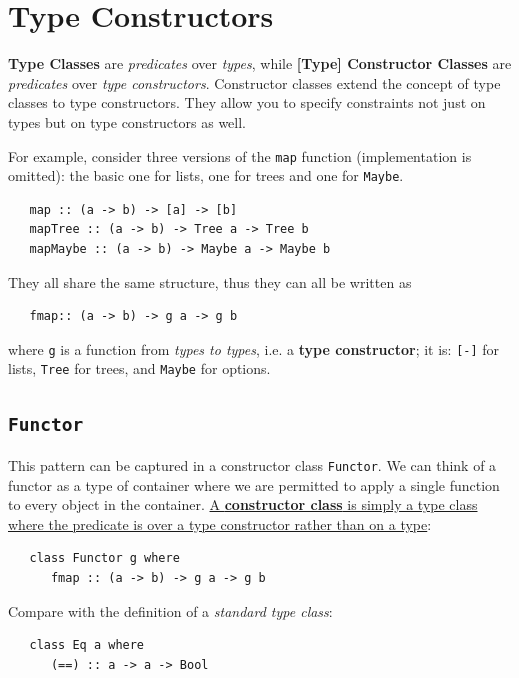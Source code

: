 \section{Type Constructors}
\textbf{Type Classes} are \textit{predicates} over \textit{types},
while \textbf{[Type] Constructor Classes} are \textit{predicates} over \textit{type constructors}.
Constructor classes extend the concept of type classes to type constructors. They allow you to specify constraints not just on types but on type constructors as well.


For example, consider three versions of the \lstinline|map| function (implementation is omitted): the basic one for lists, one for trees and one for \lstinline|Maybe|.
\begin{lstlisting}
   map :: (a -> b) -> [a] -> [b]
   mapTree :: (a -> b) -> Tree a -> Tree b
   mapMaybe :: (a -> b) -> Maybe a -> Maybe b
\end{lstlisting}
They all share the same structure, thus they can all be written as
\begin{lstlisting}
   fmap:: (a -> b) -> g a -> g b
\end{lstlisting}
where \lstinline|g| is a function from \textit{types to types}, i.e.
a \textbf{type constructor};
it is:
\lstinline|[-]| for lists, \lstinline|Tree| for trees, and \lstinline|Maybe| for options.

\subsection{\texttt{Functor}}
This pattern can be captured in a constructor
class \lstinline|Functor|. 
We can think of a functor as a type of container where we are permitted to apply a single function to every object in the container.
\ul{A \textbf{constructor class} is simply a type class where
the predicate is over a type constructor rather
than on a type}:
\begin{lstlisting}
   class Functor g where
      fmap :: (a -> b) -> g a -> g b
\end{lstlisting}

Compare with the definition of a \textit{standard type class}:
\begin{lstlisting}
   class Eq a where
      (==) :: a -> a -> Bool
\end{lstlisting}

